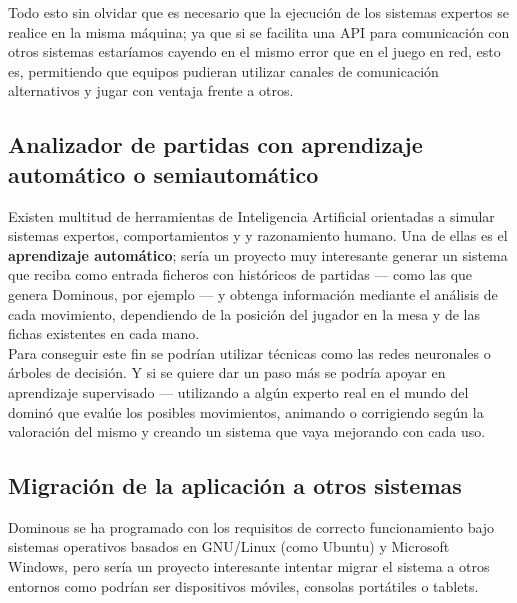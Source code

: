 Todo esto sin olvidar que es necesario que la ejecución de los sistemas expertos se realice en la misma máquina; ya que
si se facilita una API para comunicación con otros sistemas estaríamos cayendo en el mismo error que en el juego en red, 
esto es, permitiendo que equipos pudieran utilizar canales de comunicación alternativos y jugar con ventaja frente a otros.

\subsection{Analizador de partidas con aprendizaje automático o semiautomático}

Existen multitud de herramientas de Inteligencia Artificial orientadas a simular sistemas expertos, comportamientos y 
y razonamiento humano. Una de ellas es el \textbf{aprendizaje automático}; sería un proyecto muy interesante generar un sistema
que reciba como entrada ficheros con históricos de partidas --- como las que genera Dominous, por ejemplo --- y obtenga
información mediante el análisis de cada movimiento, dependiendo de la posición del jugador en la mesa y de las fichas
existentes en cada mano. \\

Para conseguir este fin se podrían utilizar técnicas como las redes neuronales o árboles de decisión. Y si se quiere
dar un paso más se podría apoyar en aprendizaje supervisado --- utilizando a algún experto real en el mundo del dominó
que evalúe los posibles movimientos, animando o corrigiendo según la valoración del mismo y creando un sistema que
vaya mejorando con cada uso.

\subsection{Migración de la aplicación a otros sistemas}

Dominous se ha programado con los requisitos de correcto funcionamiento bajo sistemas operativos basados en GNU/Linux (como
Ubuntu) y Microsoft Windows, pero sería un proyecto interesante intentar migrar el sistema a otros entornos como podrían ser
dispositivos móviles, consolas portátiles o tablets.
